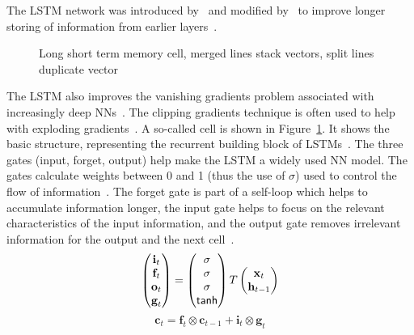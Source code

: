 The \ac{LSTM} network was introduced by~\cite{hochreiter_long_1997} and modified
by~\cite{gers_learning_1999} to improve longer storing of information from earlier
layers~\citep{chauhan_review_2018}.
\begin{figure}[ht]
    \centering
    
    \caption[Long short term memoory cell]{%
        Long short term memory cell, merged lines stack vectors, split lines duplicate
        vector~\citep{goodfellow_deep_2016,yu_review_2019}\label{fig:lstm}
    }
\end{figure}
The \ac{LSTM} also improves the vanishing gradients problem associated with
increasingly deep \acp{NN}~\citep{sherstinsky_fundamentals_2020}.
The clipping gradients technique is often used to help with exploding
gradients~\citep{goodfellow_deep_2016}.
A so-called cell is shown in Figure~\ref{fig:lstm}.
It shows the basic structure, representing the recurrent building block of
\acp{LSTM}~\citep{goodfellow_deep_2016}.
The three gates (input, forget, output) help make the \ac{LSTM} a widely used \ac{NN} model.
The gates calculate weights between 0 and 1 (thus the use of $\sigma$) used to control
the flow of information~\citep{goodfellow_deep_2016}.
The forget gate is part of a self-loop which helps to accumulate information longer, the input
gate helps to focus on the relevant characteristics of the input information,
and the output gate removes irrelevant information for the output and the next
cell~\citep{goodfellow_deep_2016}.
\begin{equation}\label{eq:lstm-gates}
    \begin{pmatrix}
        \textbf{i}_t \\
        \textbf{f}_t \\
        \textbf{o}_t \\
        \textbf{g}_t
    \end{pmatrix}
    =
    \begin{pmatrix}
        \sigma \\
        \sigma \\
        \sigma \\
        \textsf{tanh}
    \end{pmatrix}
    T
    \begin{pmatrix}
        \textbf{x}_{t} \\
        \textbf{h}_{t-1}
    \end{pmatrix}
\end{equation}
\begin{equation}\label{eq:lstm-c}
    \textbf{c}_t=\textbf{f}_t\otimes\textbf{c}_{t-1} + \textbf{i}_t\otimes\textbf{g}_t
\end{equation}
